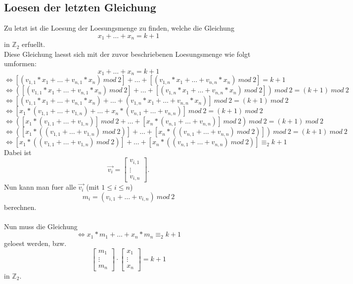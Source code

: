 \documentclass[a4paper,10pt,ngerman]{scrartcl}
\begin{document}
\subsection{Loesen der letzten Gleichung}
Zu letzt ist die Loesung der Loesungsmenge zu finden, welche die Gleichung 
\[x_1 + \dots + x_n = k + 1\]
in \(\mathbb{Z}_{2}\) erfuellt.\\

Diese Gleichung laesst sich mit der zuvor beschriebenen Loesungsmenge wie folgt umformen:
\[x_1 + \dots + x_n = k + 1\]
\[\Leftrightarrow [(v_{1,1} * x_1 + \dots + v_{n,1} * x_n) \ mod \ 2] + \dots + [(v_{1,n} * x_1 + \dots + v_{n,n} * x_n) \ mod \ 2] = k + 1\]
\[\Leftrightarrow ([(v_{1,1} * x_1 + \dots + v_{n,1} * x_n) \ mod \ 2] + \dots + [(v_{1,n} * x_1 + \dots + v_{n,n} * x_n) \ mod \ 2]) \ mod \ 2 = (k + 1) \ mod \ 2\]
\[\Leftrightarrow [(v_{1,1} * x_1 + \dots + v_{n,1} * x_n) + \dots + (v_{1,n} * x_1 + \dots + v_{n,n} * x_n)] \ mod \ 2 = (k + 1) \ mod \ 2\]
\[\Leftrightarrow [x_1 * (v_{1,1} + \dots + v_{1,n}) + \dots + x_n * (v_{n,1} + \dots + v_{n,n})] \ mod \ 2 = (k + 1) \ mod \ 2\]
\[\Leftrightarrow ([x_1 * (v_{1,1} + \dots + v_{1,n})] \ mod \ 2 + \dots + [x_n * (v_{n,1} + \dots + v_{n,n})] \ mod \ 2) \ mod \ 2 = (k + 1) \ mod \ 2\]
\[\Leftrightarrow ([x_1 * ((v_{1,1} + \dots + v_{1,n}) \ mod \ 2)] + \dots + [x_n * ((v_{n,1} + \dots + v_{n,n}) \ mod \ 2)]) \ mod \ 2 = (k + 1) \ mod \ 2\]
\[\Leftrightarrow [x_1 * ((v_{1,1} + \dots + v_{1,n}) \ mod \ 2)] + \dots + [x_n * ((v_{n,1} + \dots + v_{n,n}) \ mod \ 2)] \equiv_2 k + 1\]
Dabei ist
\[\vec{v_i} = \begin{bmatrix}
           v_{i,1} \\
           \vdots \\
           v_{i,n}
         \end{bmatrix} .
\]
Nun kann man fuer alle \(\vec{v_i}\) (mit \(1 \leq i \leq n\))
\[m_i = (v_{i,1} + \dots + v_{i,n}) \ mod \ 2\]
berechnen.\\\\
Nun muss die Gleichung 
\[\Leftrightarrow x_1 * m_1 + \dots + x_n * m_n \equiv_2 k + 1\]
geloest werden, bzw.
\[
\begin{bmatrix}
						m_{1} \\
           \vdots \\
           m_{n}
         \end{bmatrix}
				\cdot 
				\begin{bmatrix}
           x_{1} \\
           \vdots \\
           x_{n}
         \end{bmatrix}
				= k + 1
\]
in \(\mathbb{Z}_{2}\).
\end{document}
